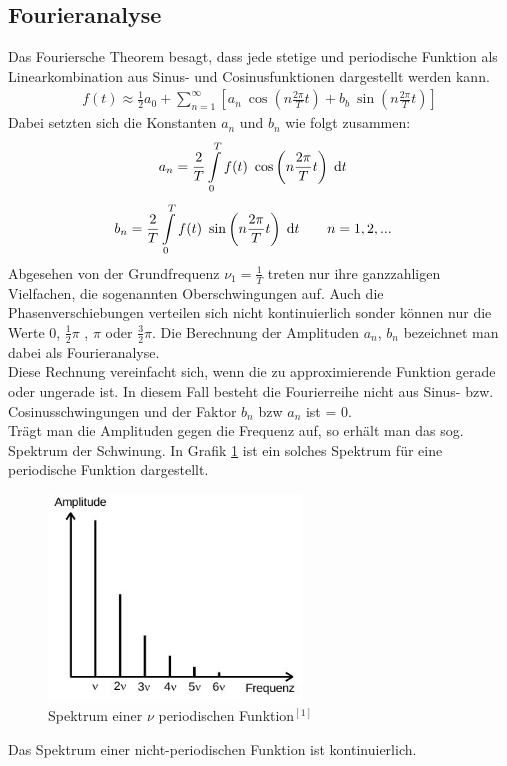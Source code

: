 \subsection{Fourieranalyse}
Das Fouriersche Theorem besagt, dass jede stetige und periodische Funktion als Linearkombination aus Sinus- und Cosinusfunktionen dargestellt werden kann. 
\begin{align}
f(t)\approx \frac{1}{2} a_0 + \sum^\infty_{n=1} \left[ a_n~\cos\left(n\frac{2\pi}{T}t\right)+ b_b~ \sin\left(n\frac{2\pi}{T}t\right)\right]
\label{eq_fanalyse}
\end{align}
Dabei setzten sich die Konstanten $a_n$ und $b_n$ wie folgt zusammen:
\begin{align}
 a_n&=\frac{2}{T}\int\limits_{0}^T f(t)~\cos\left(n\frac{2\pi}{T}t\right) \; \mathrm{d} t
 \label{eq_an}
 \end{align}
 \begin{align}
 b_n&=\frac{2}{T}\int\limits_{0}^T f(t)~\sin\left(n\frac{2\pi}{T}t\right) \; \mathrm{d} t\qquad n=1,2,...
 \label{eq_bn}
\end{align}
Abgesehen von der Grundfrequenz $\nu_1 =\frac{1}{T}$ treten nur ihre ganzzahligen Vielfachen, die sogenannten Oberschwingungen auf. Auch die Phasenverschiebungen verteilen sich nicht kontinuierlich sonder können nur die Werte 0, $\frac{1}{2}\pi$ , $\pi$ oder $\frac{3}{2}\pi$. Die Berechnung der Amplituden $a_n$, $b_n$ bezeichnet man dabei als Fourieranalyse.\\
Diese Rechnung vereinfacht sich, wenn die zu approximierende Funktion gerade oder ungerade ist. In diesem Fall besteht die Fourierreihe nicht aus Sinus- bzw. Cosinusschwingungen und der Faktor $b_n$ bzw $a_n$ ist = 0.\\
Trägt man die Amplituden gegen die Frequenz auf, so erhält man das sog. Spektrum der Schwinung. In Grafik \ref{pic_spec} ist ein solches Spektrum für eine periodische Funktion dargestellt. 
\begin{figure}[htbp]
\includegraphics[width=0.6\textwidth]{pics/amplitude_frequenz.jpeg}
\caption{Spektrum einer $\nu$ periodischen Funktion$^{[1]}$}
\label{pic_spec}
\end{figure} Das Spektrum einer nicht-periodischen Funktion ist kontinuierlich.\\

